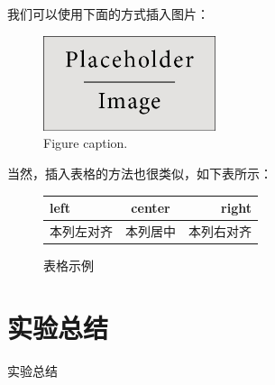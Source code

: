 \documentclass[hyperref,UTF8]{ctexart}
\begin{document}
我们可以使用下面的方式插入图片：

\begin{figure}[H]
\centering
\includegraphics[width=0.45\textwidth,height=0.25\textwidth]{placeholder} %
\caption{Figure caption.}
\label{fig:image}
\end{figure}

当然，插入表格的方法也很类似，如下表所示：

\begin{figure}[H]
\centering
\begin{tabular}{|l|c|r|}
\hline
left & center & right	\\
\hline
本列左对齐 & 本列居中 & 本列右对齐	\\
\hline
\end{tabular}
\caption{表格示例}
\end{figure}


\section{实验总结}

实验总结






\end{document}
